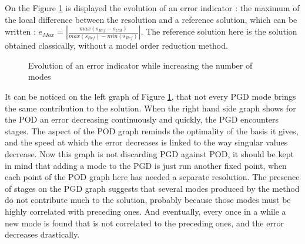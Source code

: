\documentclass[12pt,a4paper]{article}
\begin{document}
On the Figure \ref{ErrorEvolution} is displayed the evolution of an error indicator : the maximum of the local difference between the resolution and a reference solution, which can be written : $e_ {Max} = \left|\frac{ max(s_ {Ref} - s_ {Cal}) } {max(s_ {Ref}) - min(s_ {Ref})} \right| $. The reference solution here is the solution obtained classically, without a model order reduction method.

\begin{figure}[!ht]
\centering
{}
\hspace{0.5cm}
\caption{Evolution of an error indicator while increasing the number of modes\label{ErrorEvolution}}
\end{figure}

It can be noticed on the left graph of Figure \ref{ErrorEvolution}, that not every PGD mode brings the same contribution to the solution. When the right hand side graph shows for the POD an error decreasing 	continuously and quickly, the PGD encounters stages. The aspect of the POD graph reminds the optimality of the basis it gives, and the speed at which the error decreases is linked to the way singular values decrease. Now this graph is not discarding PGD against POD, it should be kept in mind that adding a mode to the PGD is just run another fixed point, when each point of the POD graph here has needed a separate resolution. The presence of stages on the PGD graph suggests that several modes produced by the method do not contribute much to the solution, probably because those modes must be highly correlated with preceding ones. And eventually, every once in a while a new mode is found that is not correlated to the preceding ones, and the error decreases drastically.
\end{document}
